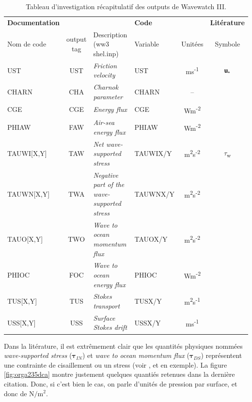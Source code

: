 \documentclass[10pt]{article}
\numberwithin{equation}{section}
\newcommand{\ust}{\vb{u}_{\ast}}
\begin{document}
\begin{table}[htbp]
\caption{\label{tab:orgae18644}Tableau d'investigation récapitulatif des outputs de Wavewatch III.}
\centering
\begin{tabular}{lcl|lc|c}
\hline
\hline
\textbf{Documentation} &  &  & \textbf{Code} &  & \textbf{Litérature}\\[0pt]
Nom de code & output tag & Description (ww3 shel.inp) & Variable & Unitées & Symbole\\[0pt]
\hline
UST & UST & \emph{Friction velocity} & UST & ms\textsuperscript{-1} & \(\ust\)\\[0pt]
CHARN & CHA & \emph{Charnok parameter} & CHARN & -- & \\[0pt]
CGE & CGE & \emph{Energy flux} & CGE & Wm\textsuperscript{-2} & \\[0pt]
PHIAW & FAW & \emph{Air-sea energy flux} & PHIAW & Wm\textsuperscript{-2} & \\[0pt]
TAUWI[X,Y] & TAW & \emph{Net wave-supported stress} & TAUWIX/Y & m\textsuperscript{2}s\textsuperscript{-2} & \(\tau\)\textsubscript{w}\\[0pt]
TAUWN[X,Y] & TWA & \emph{Negative part of the wave-supported stress} & TAUWNX/Y & m\textsuperscript{2}s\textsuperscript{-2} & \\[0pt]
\hline
TAUO[X,Y] & TWO & \emph{Wave to ocean momentum flux} & TAUOX/Y & m\textsuperscript{2}s\textsuperscript{-2} & \\[0pt]
PHIOC & FOC & \emph{Wave to ocean energy flux} & PHIOC & Wm\textsuperscript{-2} & \\[0pt]
TUS[X,Y] & TUS & \emph{Stokes transport} & TUSX/Y & m\textsuperscript{2}s\textsuperscript{-1} & \\[0pt]
USS[X,Y] & USS & \emph{Surface Stokes drift} & USSX/Y & ms\textsuperscript{-1} & \\[0pt]
\hline
\end{tabular}
\end{table}

Dans la litérature, il est extrêmement clair que les quantités physiques nommées \emph{wave-supported stress} (\(\boldsymbol{\tau}_{IN}\)) et \emph{wave to ocean momentum flux} (\(\boldsymbol{\tau}_{DS}\)) représentent une contrainte de cisaillement ou un stress (voir ,  et  en exemple).
La figure \ref{fig:orga235dca} montre justement quelques quantiés retenues dans la dernière citation.
Donc, si c'est bien le cas, on parle d'unités de pression par surface, et donc de \(\mathrm{N}/\mathrm{m}^2\).\bigskip
\end{document}
